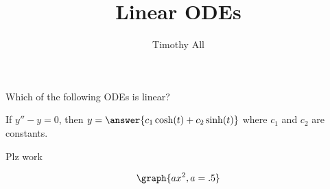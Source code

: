 \documentclass{ximera}%
\title{Linear ODEs}
\author{Timothy All}
\begin{document}
\maketitle



\begin{problem} Which of the following ODEs is linear?
\begin{multipleChoice}
\end{multipleChoice}
\end{problem}

\begin{problem}
   If $y'' - y = 0$, then $y = \answer{c_1 \cosh(t) + c_2 \sinh(t)}$ where $c_1$ and $c_2$ are constants.
\end{problem}









Plz work

\[ \graph{ax^2,a=.5} \]
\end{document}
